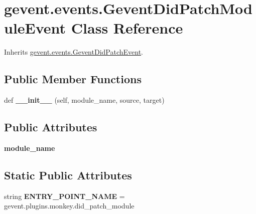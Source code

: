 \hypertarget{classgevent_1_1events_1_1_gevent_did_patch_module_event}{}\section{gevent.\+events.\+Gevent\+Did\+Patch\+Module\+Event Class Reference}
\label{classgevent_1_1events_1_1_gevent_did_patch_module_event}


Inherits \hyperlink{classgevent_1_1events_1_1_gevent_did_patch_event}{gevent.\+events.\+Gevent\+Did\+Patch\+Event}.

\subsection*{Public Member Functions}
\begin{DoxyCompactItemize}
\item 
\mbox{\label{classgevent_1_1events_1_1_gevent_did_patch_module_event_a1745ebca820a5e9b5fcec761cf00e6c3}} 
def {\bfseries \+\_\+\+\_\+init\+\_\+\+\_\+} (self, module\+\_\+name, source, target)
\end{DoxyCompactItemize}
\subsection*{Public Attributes}
\begin{DoxyCompactItemize}
\item 
\mbox{\label{classgevent_1_1events_1_1_gevent_did_patch_module_event_a5d0d21c5ceccc2e89abfd2068d696fe7}} 
{\bfseries module\+\_\+name}
\end{DoxyCompactItemize}
\subsection*{Static Public Attributes}
\begin{DoxyCompactItemize}
\item 
\mbox{\label{classgevent_1_1events_1_1_gevent_did_patch_module_event_a9f67205b9787af098213f1d94b6c473f}} 
string {\bfseries E\+N\+T\+R\+Y\+\_\+\+P\+O\+I\+N\+T\+\_\+\+N\+A\+ME} = \textquotesingle{}gevent.\+plugins.\+monkey.\+did\+\_\+patch\+\_\+module\textquotesingle{}
\end{DoxyCompactItemize}


